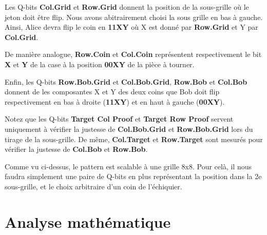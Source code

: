 \documentclass[12pt]{article}
\begin{document}
    \vspace{5mm}

    Les Q-bits \textbf{Col.Grid} et \textbf{Row.Grid} donnent la position de la sous-grille où le jeton doit être flip. Nous avons abitrairement choisi la sous grille en bas à gauche. Ainsi, Alice devra flip le coin en \textbf{11XY} où X est donné par \textbf{Row.Grid} et Y par \textbf{Col.Grid}.

    \vspace{5mm}

    De manière analogue, \textbf{Row.Coin} et \textbf{Col.Coin} représentent respectivement le bit \textbf{X} et \textbf{Y} de la case à la position \textbf{00XY} de la pièce à tourner.

    \vspace{5mm}

    Enfin, les Q-bits \textbf{Row.Bob.Grid} et \textbf{Col.Bob.Grid}, \textbf{Row.Bob} et \textbf{Col.Bob} donnent de les composantes X et Y des deux coins que Bob doit flip respectivement en bas à droite (\textbf{11XY}) et en haut à gauche (\textbf{00XY}).

    \vspace{5mm}
    Notez que les Q-bits \textbf{Target Col Proof} et \textbf{Target Row Proof} servent uniquement à vérifier la justesse de \textbf{Col.Bob.Grid} et \textbf{Row.Bob.Grid} lors du tirage de la sous-grille.
    De même, \textbf{Col.Target} et \textbf{Row.Target} sont mesurés pour vérifier la justesse de \textbf{Col.Bob} et \textbf{Row.Bob}.

    \vspace{10mm}
    Comme vu ci-dessus, le pattern est scalable à une grille 8x8. Pour celà, il nous faudra simplement une paire de Q-bits en plus représentant la position dans la 2e sous-grille, et le choix arbitraire d'un coin de l'échiquier.

    \section{Analyse mathématique}
\end{document}
